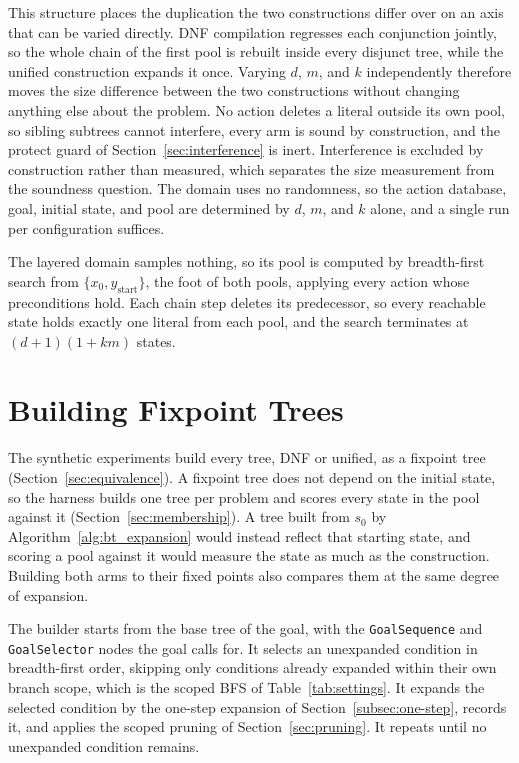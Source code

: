     This structure places the duplication the two constructions differ over on an axis that can be varied directly.
    DNF compilation regresses each conjunction jointly, so the whole chain of the first pool is rebuilt inside every disjunct tree, while the unified construction expands it once.
    Varying $d$, $m$, and $k$ independently therefore moves the size difference between the two constructions without changing anything else about the problem.
    No action deletes a literal outside its own pool, so sibling subtrees cannot interfere, every arm is sound by construction, and the protect guard of Section~\ref{sec:interference} is inert.
    Interference is excluded by construction rather than measured, which separates the size measurement from the soundness question.
    The domain uses no randomness, so the action database, goal, initial state, and pool are determined by $d$, $m$, and $k$ alone, and a single run per configuration suffices.

    \label{subsubsec:enumerating_states}
    The layered domain samples nothing, so its pool is computed by breadth-first search from $\{x_0, y_{\text{start}}\}$, the foot of both pools, applying every action whose preconditions hold.
    Each chain step deletes its predecessor, so every reachable state holds exactly one literal from each pool, and the search terminates at $(d + 1)(1 + km)$ states.
    
\section{Building Fixpoint Trees}
\label{sec:fixpoint}
    The synthetic experiments build every tree, DNF or unified, as a fixpoint tree (Section~\ref{sec:equivalence}).
    A fixpoint tree does not depend on the initial state, so the harness builds one tree per problem and scores every state in the pool against it (Section~\ref{sec:membership}).
    A tree built from $s_0$ by Algorithm~\ref{alg:bt_expansion} would instead reflect that starting state, and scoring a pool against it would measure the state as much as the construction.
    Building both arms to their fixed points also compares them at the same degree of expansion.

    

    The builder starts from the base tree of the goal, with the \texttt{GoalSequence} and \texttt{GoalSelector} nodes the goal calls for.
    It selects an unexpanded condition in breadth-first order, skipping only conditions already expanded within their own branch scope, which is the scoped BFS of Table~\ref{tab:settings}.
    It expands the selected condition by the one-step expansion of Section~\ref{subsec:one-step}, records it, and applies the scoped pruning of Section~\ref{sec:pruning}.
    It repeats until no unexpanded condition remains.

